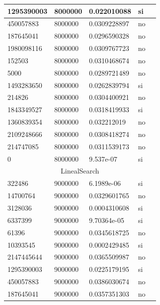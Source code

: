 \documentclass[12pt, fleqn]{article}                             %
\theoremstyle{break}                                            %
\begin{document}
\begin{longtable}{|m{5em}|m{5em}|m{10em}|m{5em}|@{}m{0pt}@{}}
            1295390003& 8000000  & 0.022010088 & si &\\[1em]    \hline
            450057883& 8000000  & 0.0309228897 & no &\\[1em]    \hline
            187645041& 8000000  & 0.0296590328 & no &\\[1em]    \hline
            1980098116& 8000000  & 0.0309767723 & no &\\[1em]    \hline
            152503& 8000000  & 0.0310468674 & no &\\[1em]    \hline
            5000& 8000000  & 0.0289721489 & no &\\[1em]    \hline
            1493283650& 8000000  & 0.0262839794 & si &\\[1em]    \hline
            214826& 8000000  & 0.0304400921 & no &\\[1em]    \hline
            1843349527& 8000000  & 0.0318419933 & si &\\[1em]    \hline
            1360839354& 8000000  & 0.032212019 & no &\\[1em]    \hline
            2109248666& 8000000  & 0.0308418274 & no &\\[1em]    \hline
            214747085& 8000000  & 0.0311539173 & no &\\[1em]    \hline
            0& 8000000  & 9.537e-07 & si &\\[1em]    \hline
            \multicolumn{5}{|c|}{LinealSearch}   \\          \hline
            322486& 9000000  & 6.1989e-06 & si &\\[1em]    \hline
            14700764& 9000000  & 0.0329601765 & no &\\[1em]    \hline
            3128036& 9000000  & 0.0004310608 & si &\\[1em]    \hline
            6337399& 9000000  & 9.70364e-05 & si &\\[1em]    \hline
            61396& 9000000  & 0.0345618725 & no &\\[1em]    \hline
            10393545& 9000000  & 0.0002429485 & si &\\[1em]    \hline
            2147445644& 9000000  & 0.0365509987 & no &\\[1em]    \hline
            1295390003& 9000000  & 0.0225179195 & si &\\[1em]    \hline
            450057883& 9000000  & 0.0386030674 & no &\\[1em]    \hline
            187645041& 9000000  & 0.0357351303 & no &\\[1em]    \hline

\end{longtable}
\end{document}
